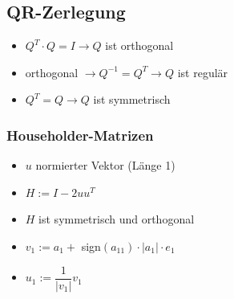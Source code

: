 \documentclass[8pt,a4paper]{scrartcl}
\begin{document}
\begin{multicols*}{3}
		\subsection{QR-Zerlegung}	
			\begin{itemize}\itemsep0pt				
				\item $Q^{T}\cdot Q =I \rightarrow Q$ ist orthogonal 
				\item 	orthogonal $\rightarrow Q^{-1} = Q^{T} \rightarrow Q$ ist regulär
				\item 	$Q^{T} = Q \rightarrow Q$ ist symmetrisch 
			\end{itemize}
		
			\subsubsection{Householder-Matrizen}
				\begin{itemize}\itemsep0pt				
					\item $u$ normierter Vektor (Länge 1)
					\item $H := I - 2uu^{T}$
					\item $H$ ist symmetrisch und orthogonal
					\item $v_{1} := a_{1} + $ sign$(a_{11}) \cdot |a_{1}| \cdot e_{1}$
					\item $u_{1} := \dfrac{1}{|v_{1}|}v_{1}$
					
				
				\end{itemize}
				

\end{multicols*}
\end{document}
